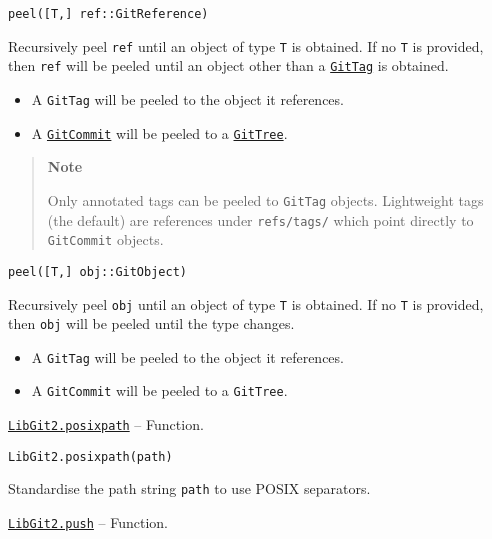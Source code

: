 \begin{adjustwidth}{2em}{0pt}


\begin{verbatim}
peel([T,] ref::GitReference)
\end{verbatim}

Recursively peel \texttt{ref} until an object of type \texttt{T} is obtained. If no \texttt{T} is provided, then \texttt{ref} will be peeled until an object other than a \hyperlink{10467695058580020738}{\texttt{GitTag}} is obtained.

\begin{itemize}
\item A \texttt{GitTag} will be peeled to the object it references.


\item A \hyperlink{5346527129202716606}{\texttt{GitCommit}} will be peeled to a \hyperlink{6242150303858692069}{\texttt{GitTree}}.

\end{itemize}
\begin{quote}
\textbf{Note}

Only annotated tags can be peeled to \texttt{GitTag} objects. Lightweight tags (the default) are references under \texttt{refs/tags/} which point directly to \texttt{GitCommit} objects.

\end{quote}



\begin{lstlisting}
peel([T,] obj::GitObject)
\end{lstlisting}

Recursively peel \texttt{obj} until an object of type \texttt{T} is obtained. If no \texttt{T} is provided, then \texttt{obj} will be peeled until the type changes.

\begin{itemize}
\item A \texttt{GitTag} will be peeled to the object it references.


\item A \texttt{GitCommit} will be peeled to a \texttt{GitTree}.

\end{itemize}


\end{adjustwidth}
\hypertarget{8201535180875495206}{}
\hyperlink{8201535180875495206}{\texttt{LibGit2.posixpath}}  -- {Function.}

\begin{adjustwidth}{2em}{0pt}


\begin{verbatim}
LibGit2.posixpath(path)
\end{verbatim}

Standardise the path string \texttt{path} to use POSIX separators.



\end{adjustwidth}
\hypertarget{9401118176170322302}{}
\hyperlink{9401118176170322302}{\texttt{LibGit2.push}}  -- {Function.}

